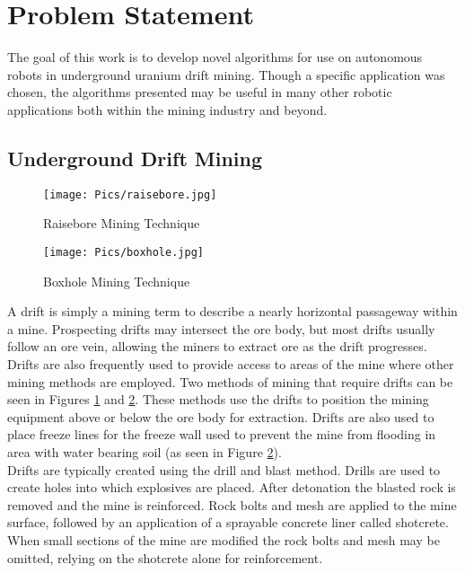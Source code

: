 \section{Problem Statement}
\label{sec:prob}
The goal of this work is to develop novel algorithms for use on autonomous robots in underground uranium drift mining. Though a specific application was chosen, the algorithms presented may be useful in many other robotic applications both within the mining industry and beyond.\\

\subsection{Underground Drift Mining}

\begin{figure}
    \centering
    \texttt{[image: Pics/raisebore.jpg]}
    \caption{Raisebore Mining Technique \cite{weblink}}
    \label{fig:raisebore}
\end{figure}
\begin{figure}
    \centering
    \texttt{[image: Pics/boxhole.jpg]}
    \caption{Boxhole Mining Technique \cite{weblink}}
    \label{fig:boxhole}
\end{figure}
A drift is simply a mining term to describe a nearly horizontal passageway within a mine. Prospecting drifts may intersect the ore body, but most drifts usually follow an ore vein, allowing the miners to extract ore as the drift progresses. Drifts are also frequently used to provide access to areas of the mine where other mining methods are employed. Two methods of mining that require drifts can be seen in Figures \ref{fig:raisebore} and \ref{fig:boxhole}. These methods use the drifts to position the mining equipment above or below the ore body for extraction. Drifts are also used to place freeze lines for the freeze wall used to prevent the mine from flooding in area with water bearing soil (as seen in Figure \ref{fig:boxhole}).\\

Drifts are typically created using the drill and blast method. Drills are used to create holes into which explosives are placed. After detonation the blasted rock is removed and the mine is reinforced. Rock bolts and mesh are applied to the mine surface, followed by an application of a sprayable concrete liner called shotcrete. When small sections of the mine are modified the rock bolts and mesh may be omitted, relying on the shotcrete alone for reinforcement.\\

